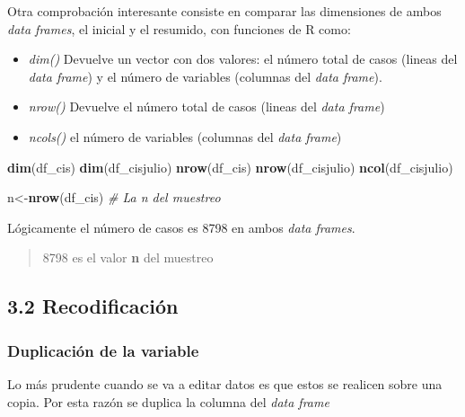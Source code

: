\documentclass[
  12 pt,
  a4paper,
]{article}
\newenvironment{Shaded}{\begin{snugshade}}{\end{snugshade}}
\newcommand{\CommentTok}[1]{\textcolor[rgb]{0.56,0.35,0.01}{\textit{#1}}}
\newcommand{\FunctionTok}[1]{\textcolor[rgb]{0.13,0.29,0.53}{\textbf{#1}}}
\newcommand{\NormalTok}[1]{#1}
\newcommand{\OtherTok}[1]{\textcolor[rgb]{0.56,0.35,0.01}{#1}}
\newcommand{\SpecialCharTok}[1]{\textcolor[rgb]{0.81,0.36,0.00}{\textbf{#1}}}
\providecommand{\tightlist}{%
  \setlength{\itemsep}{0pt}\setlength{\parskip}{0pt}}
\begin{document}
Otra comprobación interesante consiste en comparar las dimensiones de
ambos \emph{data frames}, el inicial y el resumido, con funciones de R
como:

\begin{itemize}
\tightlist
\item
  \emph{dim()} Devuelve un vector con dos valores: el número total de
  casos (lineas del \emph{data frame}) y el número de variables
  (columnas del \emph{data frame}).
\item
  \emph{nrow()} Devuelve el número total de casos (lineas del \emph{data
  frame})
\item
  \emph{ncols()} el número de variables (columnas del \emph{data frame})
\end{itemize}

\begin{Shaded}
\begin{Highlighting}[]
\FunctionTok{dim}\NormalTok{(df\_cis)}
\FunctionTok{dim}\NormalTok{(df\_cisjulio)}
\FunctionTok{nrow}\NormalTok{(df\_cis)}
\FunctionTok{nrow}\NormalTok{(df\_cisjulio)}
\FunctionTok{ncol}\NormalTok{(df\_cisjulio)}

\NormalTok{n}\OtherTok{\textless{}{-}}\FunctionTok{nrow}\NormalTok{(df\_cis) }\CommentTok{\# La n del muestreo}
\end{Highlighting}
\end{Shaded}

Lógicamente el número de casos es 8798 en ambos \emph{data frames}.

\begin{quote}
8798 es el valor \textbf{n} del muestreo
\end{quote}

\hypertarget{recodificaciuxf3n}{%
\subsection{3.2 Recodificación}\label{recodificaciuxf3n}}

\hypertarget{duplicaciuxf3n-de-la-variable}{%
\subsubsection{Duplicación de la
variable}\label{duplicaciuxf3n-de-la-variable}}

Lo más prudente cuando se va a editar datos es que estos se realicen
sobre una copia. Por esta razón se duplica la columna del \emph{data
frame}

\begin{Shaded}
\end{Shaded}
\end{document}
